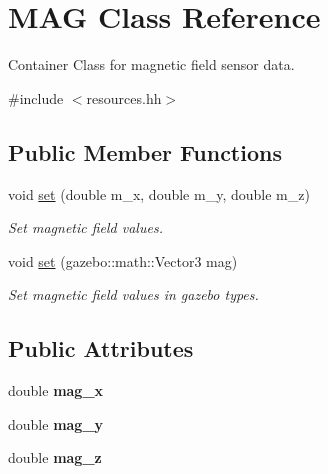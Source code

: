 \hypertarget{classMAG}{\section{\-M\-A\-G \-Class \-Reference}
\label{classMAG}
}


\-Container \-Class for magnetic field sensor data.  




{\ttfamily \#include $<$resources.\-hh$>$}

\subsection*{\-Public \-Member \-Functions}
\begin{DoxyCompactItemize}
\item 
\hypertarget{classMAG_a4bcbb01a0e2c45b0ae41e4d3ad5cc878}{void \hyperlink{classMAG_a4bcbb01a0e2c45b0ae41e4d3ad5cc878}{set} (double m\-\_\-x, double m\-\_\-y, double m\-\_\-z)}\label{classMAG_a4bcbb01a0e2c45b0ae41e4d3ad5cc878}

\begin{DoxyCompactList}\small\item\em \-Set magnetic field values. \end{DoxyCompactList}\item 
\hypertarget{classMAG_a1c816ef6f02a6311c2d6f633d27c3d8e}{void \hyperlink{classMAG_a1c816ef6f02a6311c2d6f633d27c3d8e}{set} (gazebo\-::math\-::\-Vector3 mag)}\label{classMAG_a1c816ef6f02a6311c2d6f633d27c3d8e}

\begin{DoxyCompactList}\small\item\em \-Set magnetic field values in gazebo types. \end{DoxyCompactList}\end{DoxyCompactItemize}
\subsection*{\-Public \-Attributes}
\begin{DoxyCompactItemize}
\item 
\hypertarget{classMAG_a29709cccd4a8fc8d3ecf8646e5d24fd6}{double {\bfseries mag\-\_\-x}}\label{classMAG_a29709cccd4a8fc8d3ecf8646e5d24fd6}

\item 
\hypertarget{classMAG_a3eb871e74ebc1576b4745af33a9bbd0c}{double {\bfseries mag\-\_\-y}}\label{classMAG_a3eb871e74ebc1576b4745af33a9bbd0c}

\item 
\hypertarget{classMAG_a5762e6f926b3ec3a8b6ff18cdd6965ba}{double {\bfseries mag\-\_\-z}}\label{classMAG_a5762e6f926b3ec3a8b6ff18cdd6965ba}

\end{DoxyCompactItemize}
